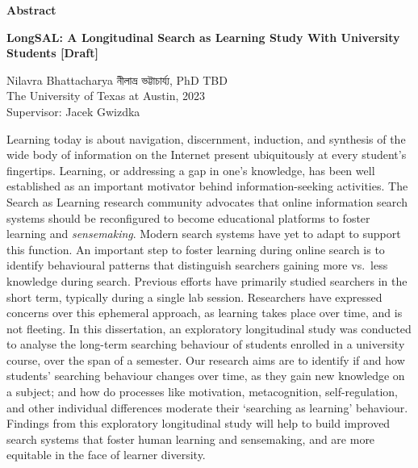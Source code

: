 \documentclass[letterpaper, nobind]{templates/ociamthesis}
\begin{document}
\begin{romanpages}



\begin{center}
  \textbf{Abstract}\\
  
  \vspace{18pt}
  
  \begin{spacing}{2}
    {\Large{\textbf{LongSAL: A Longitudinal Search as Learning Study With University Students {[}Draft{]}}}}
  \end{spacing}

  \vspace{18pt}

  \begin{spacing}{1.4}
    Nilavra Bhattacharya 
    {\secondlanguage নীলাভ্র ভট্টাচার্য্য}, 
    PhD TBD\\
    The University of Texas at Austin, 
    2023\\
    \vspace{18pt}
    Supervisor: Jacek Gwizdka
  \end{spacing}

\end{center}

\begin{spacing}{1.5}
  \indent
  Learning today is about navigation, discernment, induction, and synthesis of the wide body of information on the Internet present ubiquitously at every student's fingertips.
  Learning, or addressing a gap in one's knowledge, has been well established as an important motivator behind information-seeking activities.
  The Search as Learning research community advocates that online information search systems should be reconfigured to become educational platforms to foster learning and \emph{sensemaking}.
  Modern search systems have yet to adapt to support this function.
  An important step to foster learning during online search is to identify behavioural patterns that distinguish searchers gaining more vs.~less knowledge during search.
  Previous efforts have primarily studied searchers in the short term, typically during a single lab session.
  Researchers have expressed concerns over this ephemeral approach, as learning takes place over time, and is not fleeting.
  In this dissertation, an exploratory longitudinal study was conducted to analyse the long-term searching behaviour of students enrolled in a university course, over the span of a semester.
  Our research aims are to identify if and how students' searching behaviour changes over time, as they gain new knowledge on a subject; and how do processes like motivation, metacognition, self-regulation, and other individual differences moderate their `searching as learning' behaviour.
  Findings from this exploratory longitudinal study will help to build improved search systems that foster human learning and sensemaking, and are more equitable in the face of learner diversity.
\end{spacing}


\end{romanpages}
\end{document}

